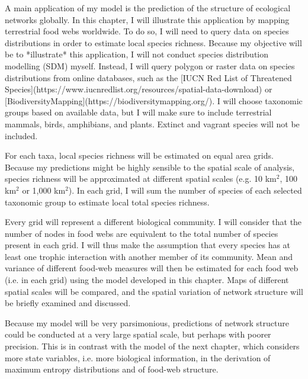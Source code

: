 A main application of my model is the prediction of the structure of ecological
networks globally. In this chapter, I will illustrate this application by
mapping terrestrial food webs worldwide. To do so, I will need to query data on
species distributions in order to estimate local species richness. Because my
objective will be to *illustrate* this application, I will not conduct species
distribution modelling (SDM) myself. Instead, I will query polygon or raster
data on species distributions from online databases, such as the [IUCN Red List
of Threatened
Species](https://www.iucnredlist.org/resources/spatial-data-download) or
[BiodiversityMapping](https://biodiversitymapping.org/). I will choose taxonomic
groups based on available data, but I will make sure to include terrestrial
mammals, birds, amphibians, and plants. Extinct and vagrant species will not be
included.

For each taxa, local species richness will be estimated on equal area grids.
Because my predictions might be highly sensible to the spatial scale of
analysis, species richness will be approximated at different spatial scales
(e.g. 10 km$^2$, 100 km$^2$ or 1,000 km$^2$). In each grid, I will sum the
number of species of each selected taxonomic group to estimate local total
species richness.

Every grid will represent a different biological community. I will consider that
the number of nodes in food webs are equivalent to the total number of species
present in each grid. I will thus make the assumption that every species has at
least one trophic interaction with another member of its community. Mean and
variance of different food-web measures will then be estimated for each food web
(i.e. in each grid) using the model developed in this chapter. Maps of different
spatial scales will be compared, and the spatial variation of network structure
will be briefly examined and discussed.

Because my model will be very parsimonious, predictions of network structure
could be conducted at a very large spatial scale, but perhaps with poorer
precision. This is in contrast with the model of the next chapter, which
considers more state variables, i.e. more biological information, in the
derivation of maximum entropy distributions and of food-web structure.

